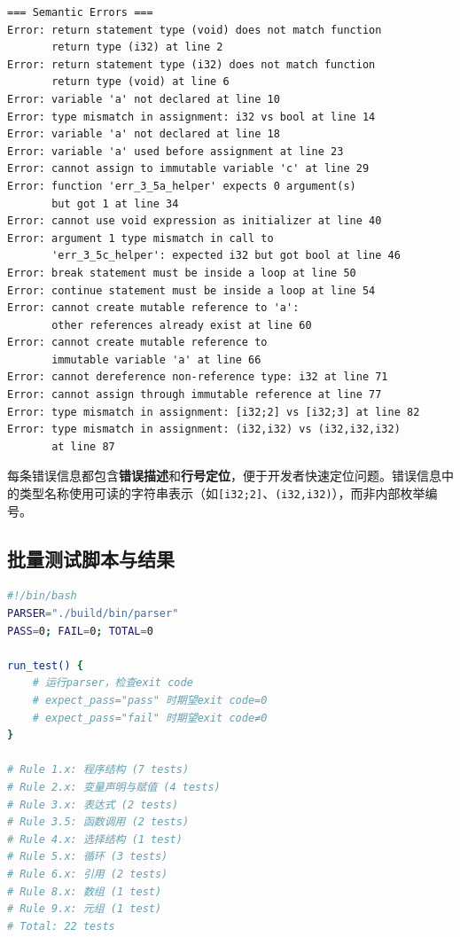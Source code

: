 \documentclass[12pt,a4paper]{ctexart}
\begin{document}
\begin{lstlisting}[caption={语义错误检测实际输出（节选）}, basicstyle=\ttfamily\footnotesize]
=== Semantic Errors ===
Error: return statement type (void) does not match function
       return type (i32) at line 2
Error: return statement type (i32) does not match function
       return type (void) at line 6
Error: variable 'a' not declared at line 10
Error: type mismatch in assignment: i32 vs bool at line 14
Error: variable 'a' not declared at line 18
Error: variable 'a' used before assignment at line 23
Error: cannot assign to immutable variable 'c' at line 29
Error: function 'err_3_5a_helper' expects 0 argument(s)
       but got 1 at line 34
Error: cannot use void expression as initializer at line 40
Error: argument 1 type mismatch in call to
       'err_3_5c_helper': expected i32 but got bool at line 46
Error: break statement must be inside a loop at line 50
Error: continue statement must be inside a loop at line 54
Error: cannot create mutable reference to 'a':
       other references already exist at line 60
Error: cannot create mutable reference to
       immutable variable 'a' at line 66
Error: cannot dereference non-reference type: i32 at line 71
Error: cannot assign through immutable reference at line 77
Error: type mismatch in assignment: [i32;2] vs [i32;3] at line 82
Error: type mismatch in assignment: (i32,i32) vs (i32,i32,i32)
       at line 87
\end{lstlisting}

每条错误信息都包含\textbf{错误描述}和\textbf{行号定位}，便于开发者快速定位问题。错误信息中的类型名称使用可读的字符串表示（如\texttt{[i32;2]}、\texttt{(i32,i32)}），而非内部枚举编号。

\subsection{批量测试脚本与结果}

\begin{lstlisting}[language=bash, caption={semantic\_tests.sh 测试脚本结构}]
#!/bin/bash
PARSER="./build/bin/parser"
PASS=0; FAIL=0; TOTAL=0

run_test() {
    # 运行parser，检查exit code
    # expect_pass="pass" 时期望exit code=0
    # expect_pass="fail" 时期望exit code≠0
}

# Rule 1.x: 程序结构 (7 tests)
# Rule 2.x: 变量声明与赋值 (4 tests)
# Rule 3.x: 表达式 (2 tests)
# Rule 3.5: 函数调用 (2 tests)
# Rule 4.x: 选择结构 (1 test)
# Rule 5.x: 循环 (3 tests)
# Rule 6.x: 引用 (2 tests)
# Rule 8.x: 数组 (1 test)
# Rule 9.x: 元组 (1 test)
# Total: 22 tests
\end{lstlisting}
\end{document}
